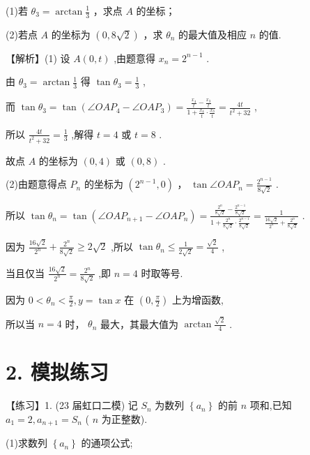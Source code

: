 \documentclass[10pt]{article}
\begin{document}
(1)若 \({\theta }_{3} = \arctan \frac{1}{3}\) ，求点 \(A\) 的坐标；

(2)若点 \(A\) 的坐标为 \(\left( {0,{8\sqrt{2}}}\right)\) ，求 \({\theta }_{n}\) 的最大值及相应 \(n\) 的值.

【解析】(1) 设 \(A\left( {0,t}\right)\) ,由题意得 \({x}_{n} = {2}^{n - 1}\) .

由 \({\theta }_{3} = \arctan \frac{1}{3}\) 得 \(\tan {\theta }_{3} = \frac{1}{3}\) ,

而 \(\tan {\theta }_{3} = \tan \left( {\angle {OA}{P}_{4} - \angle {OA}{P}_{3}}\right)  = \frac{\frac{{x}_{4}}{t} - \frac{{x}_{3}}{t}}{1 + \frac{{x}_{4}}{t} \cdot  \frac{{x}_{3}}{t}} = \frac{4t}{{t}^{2} + {32}}\) ,

所以 \(\frac{4t}{{t}^{2} + {32}} = \frac{1}{3}\) ,解得 \(t = 4\) 或 \(t = 8\) .

故点 \(A\) 的坐标为 \(\left( {0,4}\right)\) 或 \(\left( {0,8}\right)\) .

(2)由题意得点 \({P}_{n}\) 的坐标为 \(\left( {{2}^{n - 1},0}\right)\) ， \(\tan \angle {OA}{P}_{n} = \frac{{2}^{n - 1}}{8\sqrt{2}}\) .

所以 \(\tan {\theta }_{n} = \tan \left( {\angle {OA}{P}_{n + 1} - \angle {OA}{P}_{n}}\right)  = \frac{\frac{{2}^{n}}{8\sqrt{2}} - \frac{{2}^{n - 1}}{8\sqrt{2}}}{1 + \frac{{2}^{n}}{8\sqrt{2}} \cdot  \frac{{2}^{n - 1}}{8\sqrt{2}}} = \frac{1}{\frac{{16}\sqrt{2}}{{2}^{n}} + \frac{{2}^{n}}{8\sqrt{2}}}\) .

因为 \(\frac{{16}\sqrt{2}}{{2}^{n}} + \frac{{2}^{n}}{8\sqrt{2}} \geq  2\sqrt{2}\) ,所以 \(\tan {\theta }_{n} \leq  \frac{1}{2\sqrt{2}} = \frac{\sqrt{2}}{4}\) ,

当且仅当 \(\frac{{16}\sqrt{2}}{{2}^{n}} = \frac{{2}^{n}}{8\sqrt{2}}\) ,即 \(n = 4\) 时取等号.

因为 \(0 < {\theta }_{n} < \frac{\pi }{2},y = \tan x\) 在 \(\left( {0,\frac{\pi }{2}}\right)\) 上为增函数,

所以当 \(n = 4\) 时， \({\theta }_{n}\) 最大，其最大值为 \(\arctan \frac{\sqrt{2}}{4}\) .

\section*{2. 模拟练习}

【练习】1. (23 届虹口二模) 记 \({S}_{n}\) 为数列 \(\left\{  {a}_{n}\right\}\) 的前 \(n\) 项和,已知 \({a}_{1} = 2,{a}_{n + 1} = {S}_{n}\) ( \(n\) 为正整数).

(1)求数列 \(\left\{  {a}_{n}\right\}\) 的通项公式;
\end{document}
